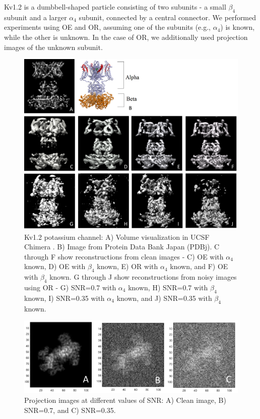 \documentclass{article}
\begin{document}
Kv1.2 is a dumbbell-shaped particle consisting of two subunits - a small $\beta_4$ subunit
and a larger $\alpha_4$ subunit, connected by a central connector. We performed
experiments using OE and OR, assuming one of the subunits (e.g., $\alpha_4$) is known,
while the other is unknown. In the case of OR, we additionally used projection
images of the unknown subunit. 
\begin{figure}[t]
\begin{center}
\includegraphics[width=.99\columnwidth]{reconstruction_all.png}
\end{center}
\vspace{-.1in}
\caption{Kv1.2 potassium channel: A) Volume visualization in UCSF Chimera \cite{chimera}. B) Image from Protein Data Bank Japan (PDBj). C through F show reconstructions from clean images - C) OE with $\alpha_4$ known, D) OE with $\beta_4$ known, E) OR with $\alpha_4$ known, and F) OE with $\beta_4$ known. G through J show reconstructions from noisy images using OR - G) SNR=0.7 with $\alpha_4$ known, H) SNR=0.7 with $\beta_4$ known, I) SNR=0.35 with $\alpha_4$ known, and J) SNR=0.35 with $\beta_4$ known.}
\label{fig:truth}
\end{figure}

\begin{figure}[]
\centering
  \includegraphics[width=.9\columnwidth]{proj_all.png}
  \caption{Projection images at different values of SNR: A) Clean image, B) SNR=0.7, and
  C) SNR=0.35.}
\label{fig:proj}
\end{figure}
\end{document}

